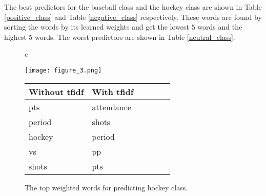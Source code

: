 \documentclass[11pt]{article}
\begin{document}
The best predictors for the baseball class and the hockey class are shown in Table \ref{positive_class} and Table \ref{negative_class} respectively. These words are found by sorting the words by its learned weights and get the lowest $5$ words and the highest $5$ words. The worst predictors are shown in Table \ref{neutral_class}.

\begin{figure}[htb]
  \begin{center}
   \begin{tabular}{c}
    \begin{minipage}{0.5\hsize}
     \vspace{-0.3cm}
     \begin{center}
     \scalebox{0.25}
      {\texttt{[image: figure\_3.png]}}
   
      \caption{The learning curve for scheduled vs. non-scheduled learning rates. }
      \label{fig:eta}
     \end{center}
    \end{minipage}

    \begin{minipage}{0.01\hsize}
    \end{minipage}

 \begin{minipage}{.33\linewidth}
  \centering
  \begin{tabular}{|l|l|r|r|r|r|}
  \hline 
  \bf Without tfidf     & \bf With tfidf     \\ \hline
   pts           & attendance  \\
   period        & shots  \\
   hockey        & period  \\
   vs            & pp  \\
   shots         & pts  \\
  \hline
  \end{tabular}
    \captionsetup{labelformat=tableonly}
    \caption{\label{tfidf}The top weighted words for predicting hockey class.}
 \end{minipage}

  \end{tabular}
 \end{center}
\vspace{-0.5cm}
\end{figure}
\end{document}
